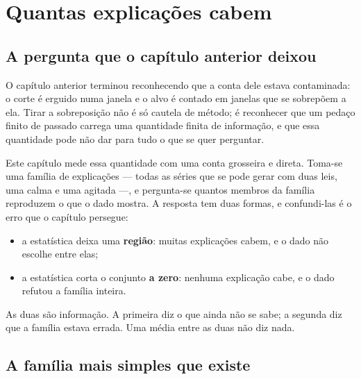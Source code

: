 %
%

\chapter{Quantas explicações cabem}
\label{cap:condicionamento}

\section{A pergunta que o capítulo anterior deixou}

O capítulo anterior terminou reconhecendo que a conta dele estava contaminada: o corte é erguido
numa janela e o alvo é contado em janelas que se sobrepõem a ela. Tirar a sobreposição não é só
cautela de método; é reconhecer que um pedaço finito de passado carrega uma quantidade finita de
informação, e que essa quantidade pode não dar para tudo o que se quer perguntar.

Este capítulo mede essa quantidade com uma conta grosseira e direta. Toma-se uma família de
explicações --- todas as séries que se pode gerar com duas leis, uma calma e uma agitada ---, e
pergunta-se quantos membros da família reproduzem o que o dado mostra. A resposta tem duas
formas, e confundi-las é o erro que o capítulo persegue:

\begin{itemize}[leftmargin=1.5em]
  \item a estatística deixa uma \textbf{região}: muitas explicações cabem, e o dado não escolhe
    entre elas;
  \item a estatística corta o conjunto \textbf{a zero}: nenhuma explicação cabe, e o dado
    refutou a família inteira.
\end{itemize}

As duas são informação. A primeira diz o que ainda não se sabe; a segunda diz que a família
estava errada. Uma média entre as duas não diz nada.

\section{A família mais simples que existe}


